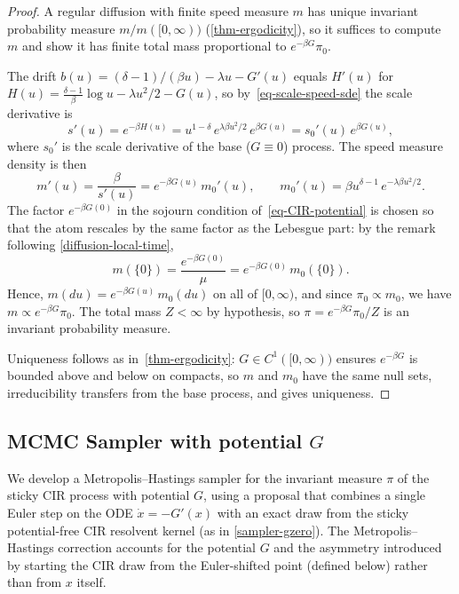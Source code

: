 \documentclass[aap,preprint]{imsart}
\numberwithin{equation}{section}
\theoremstyle{plain}
\theoremstyle{definition}
\begin{document}
\begin{proof}
  A regular diffusion with finite speed measure $m$ has unique invariant
  probability measure $m/m([0,\infty))$ (\cref{thm-ergodicity}), so it
  suffices to compute $m$ and show it has finite total mass proportional
  to $e^{-\beta G}\pi_0$.

  The drift $b(u) = (\delta-1)/(\beta u) - \lambda u - G'(u)$ equals $H'(u)$
  for $H(u) = \frac{\delta-1}{\beta}\log u - \lambda u^2/2 - G(u)$, so
  by~\cref{eq-scale-speed-sde} the scale derivative is
  \[
    s'(u) = e^{-\beta H(u)}
          = u^{1-\delta}\,e^{\lambda\beta u^2/2}\,e^{\beta G(u)}
          = s_0'(u)\,e^{\beta G(u)},
  \]
  where $s_0'$ is the scale derivative of the base ($G \equiv 0$) process.
  The speed measure density is then
  \[
    m'(u) = \frac{\beta}{s'(u)} = e^{-\beta G(u)}\,m_0'(u),
    \qquad
    m_0'(u) = \beta u^{\delta-1}\,e^{-\lambda\beta u^2/2}.
  \]
  The factor $e^{-\beta G(0)}$ in the sojourn condition
  of~\cref{eq-CIR-potential} is chosen so that the atom rescales by the
  same factor as the Lebesgue part: by the remark following
  \cref{diffusion-local-time},
  \[
    m(\{0\}) = \frac{e^{-\beta G(0)}}{\mu} = e^{-\beta G(0)}\,m_0(\{0\}).
  \]
  Hence, $m(du) = e^{-\beta G(u)}\,m_0(du)$ on all of $[0,\infty)$, and
  since $\pi_0 \propto m_0$, we have $m \propto e^{-\beta G}\pi_0$.
  The total mass $Z < \infty$ by hypothesis, so
  $\pi = e^{-\beta G}\pi_0 / Z$ is an invariant probability measure.

  Uniqueness follows as in~\cref{thm-ergodicity}: $G \in C^1([0,\infty))$
  ensures $e^{-\beta G}$ is bounded above and below on compacts, so $m$
  and $m_0$ have the same null sets, irreducibility transfers from the
  base process, and \citet[Theorem~10.0.1]{MeynTweedie1993} gives uniqueness.
\end{proof}

\subsection{MCMC Sampler with potential \texorpdfstring{$G$}{G}}\label{sampler-gpotential}

We develop a Metropolis--Hastings sampler for the invariant measure
$\pi$ of the sticky CIR process with potential $G$, using a proposal that
combines a single Euler step on the ODE $\dot x = -G'(x)$ with an exact draw
from the sticky potential-free  CIR resolvent kernel (as in \cref{sampler-gzero}).
The Metropolis--Hastings correction
accounts for the potential $G$ and the asymmetry introduced by starting the
CIR draw from the Euler-shifted point (defined below) rather than from
$x$ itself.
\end{document}
